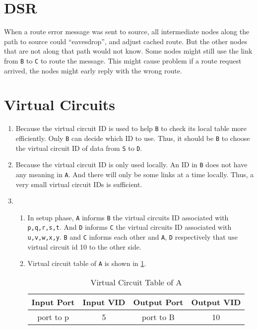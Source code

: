 \documentclass[12pt,titlepage,letterpaper]{article}
\begin{document}
\section{DSR}
When a route error message was sent to source, all intermediate nodes along the
path to source could ``eavesdrop'', and adjust cached route. But the other
nodes that are not along that path would not know. Some nodes might still use
the link from \texttt{B} to \texttt{C} to route the message. This might cause
problem if a route request arrived, the nodes might early reply with the wrong
route.

\section{Virtual Circuits}

\begin{enumerate}
    \item Because the virtual circuit ID is used to help \texttt{B} to check
        its local table more efficiently. Only \texttt{B} can decide which ID
        to use. Thus, it should be \texttt{B} to choose the virtual circuit ID
        of data from \texttt{S} to \texttt{D}.
    \item Because the virtual circuit ID is only used locally. An ID in
        \texttt{B} does not have any meaning in \texttt{A}. And there will only
        be some links at a time locally. Thus, a very small virtual circuit IDs
        is sufficient.
    \item \begin{enumerate}
        \item In setup phase, \texttt{A} informs \texttt{B} the virtual
            circuits ID associated with \texttt{p,q,r,s,t}. And \texttt{D}
            informs \texttt{C} the virtual circuits ID associated with
            \texttt{u,v,w,x,y}. \texttt{B} and \texttt{C} informs each other
            and \texttt{A}, \texttt{D} respectively that use virtual circuit id
            10 to the other side.
        \item Virtual circuit table of \texttt{A} is shown in \cref{vcta}.
            \begin{table}[H]
                \caption{Virtual Circuit Table of A}\label{vcta}\centering
                \begin{tabular}{cccc}\hline
                    Input Port & Input VID & Output Port & Output VID \\\hline
                    port to p & 5 & port to B & 10 \\

\end{tabular}
\end{table}
\end{enumerate}
\end{enumerate}
\end{document}
